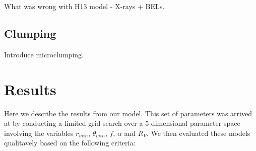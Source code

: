 \documentclass[useAMS,usenatbib]{mn2e_x}
\begin{document}
What was wrong with H13 model - X-rays + BELs.

\subsection{Clumping}

Introduce microclumping.










\section{Results}

Here we describe the results from our model. This set of parameters
was arrived at by conducting a limited grid search over a 
5-dimensional parameter space involving the variables
$r_{min}$, $\theta_{min}$, $f$, $\alpha$ and $R_V$.
We then evaluated these models qualitavely based on the following
criteria:
\end{document}
